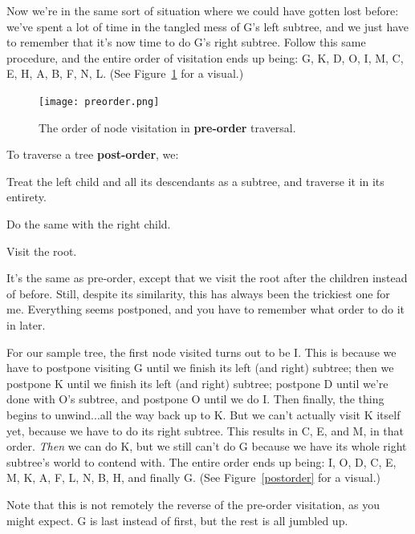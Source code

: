 Now we're in the same sort of situation where we could have gotten lost
before: we've spent a lot of time in the tangled mess of G's left subtree,
and we just have to remember that it's now time to do G's right subtree.
Follow this same procedure, and the entire order of visitation ends up
being: G, K, D, O, I, M, C, E, H, A, B, F, N, L. (See Figure~\ref{preorder}
for a visual.)

\begin{figure}[ht]
\centering
\texttt{[image: preorder.png]}
\caption{The order of node visitation in \textbf{pre-order} traversal.}
\label{preorder}
\end{figure}


\begin{framed}
To traverse a tree \textbf{post-order}, we:
\begin{compactenum}
\item Treat the left child and all its descendants as a subtree, and
traverse it in its entirety.
\item Do the same with the right child.
\item Visit the root.
\end{compactenum}
\end{framed}

It's the same as pre-order, except that we visit the root after the
children instead of before. Still, despite its similarity, this has always
been the trickiest one for me. Everything seems postponed, and you have to
remember what order to do it in later.

For our sample tree, the first node visited turns out to be I. This is
because we have to postpone visiting G until we finish its left (and right)
subtree; then we postpone K until we finish its left (and right) subtree;
postpone D until we're done with O's subtree, and postpone O until we do I.
Then finally, the thing begins to unwind...all the way back up to K. But we
can't actually visit K itself yet, because we have to do its right subtree.
This results in C, E, and M, in that order. \textit{Then} we can do K, but
we still can't do G because we have its whole right subtree's world to
contend with. The entire order ends up being: I, O, D, C, E, M, K, A, F, L,
N, B, H, and finally G. (See Figure~\ref{postorder} for a visual.) 

Note that this is not remotely the reverse of the pre-order visitation, as
you might expect. G is last instead of first, but the rest is all jumbled
up. 

